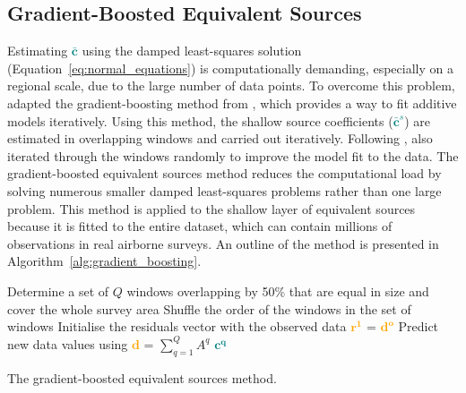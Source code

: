 \subsection{Gradient-Boosted Equivalent Sources}

Estimating \textcolor{teal}{$\bar{\mathbf{c}}$} using the damped least-squares solution (Equation~\ref{eq:normal_equations}) is computationally demanding, especially on a regional scale, due to the large number of data points.
To overcome this problem, \citet{Soler2021} adapted the gradient-boosting method from \citet{Friedman2001}, which provides a way to fit additive models iteratively. Using this method, the shallow source coefficients (\textcolor{teal}{$\bar{\mathbf{c}}^s$}) are estimated in overlapping windows and carried out iteratively. Following \citet{Friedman2002}, \citet{Soler2021} also iterated through the windows randomly to improve the model fit to the data. The gradient-boosted equivalent sources method reduces the computational load by solving numerous smaller damped least-squares problems rather than one large problem. This method is applied to the shallow layer of equivalent sources because it is fitted to the entire dataset, which can contain millions of observations in real airborne surveys. An outline of the method is presented in Algorithm~\ref{alg:gradient_boosting}.

\begin{algorithm}[!h]
    Determine a set of $Q$ windows overlapping by 50\% that are equal in size and cover the whole survey area
    \;
    Shuffle the order of the windows in the set of windows
    \;
    Initialise the residuals vector with the observed data \textcolor{orange}{$\mathbf{r^1}$} = \textcolor{orange}{$\mathbf{d^o}$}
    \;
    Predict new data values using \textcolor{orange}{$\mathbf{d}$} = $\sum\limits_{q=1}^{Q} A^q$ \textcolor{teal}{$\mathbf{c^q}$}
    \;
    \BlankLine
    \caption{The gradient-boosted equivalent sources method.}
    \label{alg:gradient_boosting}
\end{algorithm}

